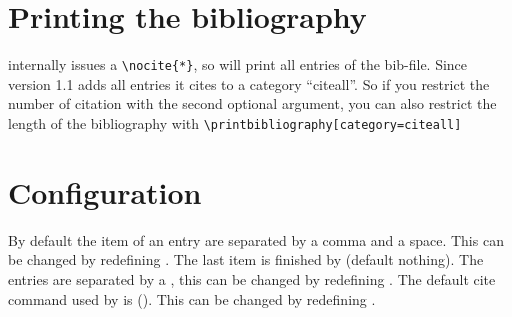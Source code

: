\documentclass[DIV=12]{scrartcl}
\begin{document}
\section{Printing the bibliography}
 internally issues a \verb+\nocite{*}+, so  will print all entries of the bib-file. Since version 1.1  adds all entries it cites  to a category \enquote{citeall}. So if you restrict the number of citation with the second optional argument, you can also restrict the length of the bibliography with \verb+\printbibliography[category=citeall]+

\section{Configuration}

\DescribeMacro\citeallgroupseparator
\DescribeMacro\citeallseparator
\DescribeMacro\citeallfinentry
\DescribeMacro\citealldefaultcite

By default the item of an entry are separated by a comma and a space. This can be changed by redefining . The last item is finished by  (default nothing). The entries are separated by a , this can be changed by redefining .
The default cite command used by  is (). This can be changed by redefining .
\end{document}
